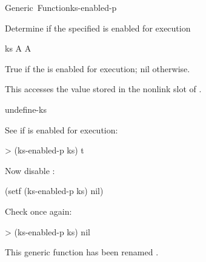 \documentclass[10pt,twoside,english,pdftex]{article}
\begin{document}
\begin{functiondoc}{Generic~Function}{ks-enabled-p}{ 
    \returns{} }
%

\fnsyntax

\fnpurpose Determine if the specified  is enabled for
execution

\fnsetf
{}

\fnmethods
{}

\fnpackage {}

\fnmodule {}

\fnargs
\begin{args}{ks}
\arg[ks] A 
\arg[boolean] A 
\end{args}

\fnreturns True if the  is enabled for execution; nil otherwise.
  
\fndescription 
This  accesses the value stored in the 
 nonlink slot of .

\begin{alsos}{undefine-ks}
\also[define-ks]
\also[ks]
\also[undefine-ks]
\end{alsos}

\fnexamples
See if   is enabled for execution:
\begin{example}
> (ks-enabled-p ks)
t
\end{example}

Now disable  :
\begin{example}
  (setf (ks-enabled-p ks) nil)
\end{example}

Check once again:
\begin{example}
> (ks-enabled-p ks)
nil
\end{example}

\fnnotes This generic function has been renamed 
\textbf{}.

\end{functiondoc}

\end{document}

